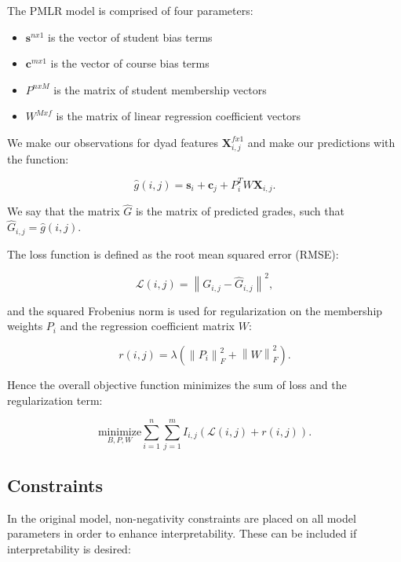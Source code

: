 \documentclass[10pt]{proc}
\newcommand{\norm}[1]{\left\lVert#1\right\rVert}
\begin{document}
The PMLR model is comprised of four parameters:

\begin{itemize}
    \item  $\bm{s}^{n x 1}$ is the vector of student bias terms
    \item  $\bm{c}^{m x 1}$ is the vector of course bias terms
    \item  $P^{n x M}$ is the matrix of student membership vectors
    \item  $W^{M x f}$ is the matrix of linear regression coefficient vectors
\end{itemize}

We make our observations for dyad features $\bm{X}_{i,j}^{f x 1}$ and make our
predictions with the function:

\begin{equation}
  \hat{g}(i,j) = \bm{s}_i + \bm{c}_j + P_i^T W \bm{X}_{i,j}.
\end{equation}

We say that the matrix $\hat{G}$ is the matrix of predicted grades, such that
$\hat{G}_{i,j} = \hat{g}(i, j)$.

The loss function is defined as the root mean squared error (RMSE):

\begin{equation}
  \mathcal{L}(i,j) = \norm{ G_{i,j} - \hat{G}_{i,j} }^2,
\end{equation}

and the squared Frobenius norm is used for regularization on the membership
weights $P_i$ and the regression coefficient matrix $W$:

\begin{equation}
  r(i,j) = \lambda (\norm{P_i}_F^2 + \norm{W}_F^2).
\end{equation}

Hence the overall objective function minimizes the sum of loss and the
regularization term:

\begin{equation}
    \underset{B, P, W}{\text{minimize}}
        \sum_{i=1}^n \sum_{j=1}^m
            I_{i,j} (\mathcal{L}(i,j) + r(i,j)).
\end{equation}


\subsection{Constraints}

In the original model, non-negativity constraints are placed on all model
parameters in order to enhance interpretability. These can be included if
interpretability is desired:
\end{document}
